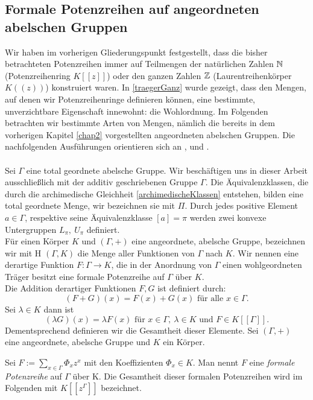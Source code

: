 \subsection{Formale Potenzreihen auf angeordneten abelschen Gruppen}
Wir haben im vorherigen Gliederungspunkt festgestellt, dass die bisher betrachteten Potenzreihen immer auf Teilmengen der natürlichen Zahlen $\mathbb{N}$ (Potenzreihenring $K[[z]]$) oder den ganzen Zahlen $\mathbb{Z}$ (Laurentreihenkörper $K((z))$) konstruiert waren. In \ref{traegerGanz} wurde gezeigt, dass den Mengen, auf denen wir Potenzreihenringe definieren können, eine bestimmte, unverzichtbare Eigenschaft innewohnt: die Wohlordnung. Im Folgenden betrachten wir bestimmte Arten von Mengen, nämlich die bereits in dem vorherigen Kapitel \ref{chap2} vorgestellten angeordneten abelschen Gruppen. Die nachfolgenden Ausführungen orientieren sich an \cite[S. 194 - 199]{fuchs66}, \cite[S. 601 - 655]{hahn07} und \cite[S. 49 - 64]{priesscrampe83}.\\\\
Sei $\Gamma$ eine total geordnete abelsche Gruppe. Wir beschäftigen uns in dieser Arbeit ausschließlich mit der additiv geschriebenen Gruppe $\Gamma$. Die Äquivalenzklassen, die durch die archimedische Gleichheit \ref{archimedischeKlassen} entstehen, bilden eine total geordnete Menge, wir bezeichnen sie mit $\Pi$. Durch jedes positive Element $a \in \Gamma$, respektive seine Äquivalenzklasse $[a]= \pi$ werden zwei konvexe Untergruppen $L_\pi,~ U_\pi$  definiert. \\
Für einen Körper $K$ und $\left(\Gamma, + \right)$ eine angeordnete, abelsche Gruppe, bezeichnen wir mit H $\left(\Gamma, K \right)$ die Menge aller Funktionen von $\Gamma$ nach $K$. 
Wir nennen eine derartige Funktion $F\colon\Gamma \rightarrow K$, die in der Anordnung von $\Gamma$ einen wohlgeordneten Träger besitzt eine formale Potenzreihe auf $\Gamma$ über $K$. \\
Die Addition derartiger Funktionen $F, G$ ist definiert durch: 
\[\left(F + G\right)(x) = F(x) + G(x) \text{ für alle } x \in \Gamma.\] 
Sei $\lambda \in K$ dann ist 
\[ \left(\lambda G\right)(x) = \lambda F(x) \text{ für } x \in \Gamma,~ \lambda \in K \text{ und }F \in K[[\Gamma]].\]
%
Dementsprechend definieren wir die Gesamtheit dieser Elemente. Sei $\left( \Gamma, + \right)$ eine angeordnete, abelsche Gruppe und $K$ ein Körper.
\begin{defn}\label{formaleSumme}
Sei $F := \sum_{x \in \Gamma}^{}\Phi_x z^x$ mit den Koeffizienten $\Phi_x \in K$. Man nennt $F$ eine \textit{formale Potenzreihe} auf $\Gamma$ über K. Die Gesamtheit dieser formalen Potenzreihen wird im Folgenden mit $K[[z^{\Gamma}]]$ bezeichnet.
\end{defn}

